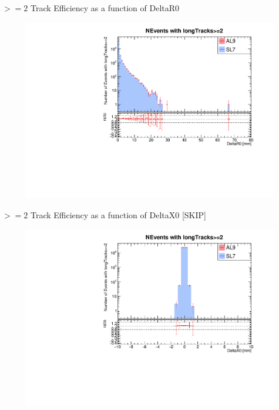 \begin{frame}{$>=2$ Track Efficiency as a function of DeltaR0}
    \begin{figure}
        \includegraphics[width=\linewidth]{./output/DeltaR0_greq2.pdf}
    \end{figure}
\end{frame}
\begin{frame}{$>=2$ Track Efficiency as a function of DeltaX0 [SKIP]}
    \begin{figure}
        \includegraphics[width=\linewidth]{./output/DeltaX0_greq2.pdf}
    \end{figure}
\end{frame}
